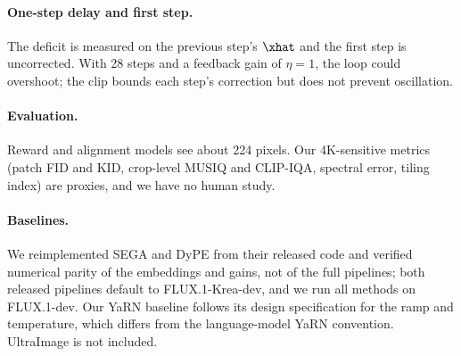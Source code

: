 \paragraph{One-step delay and first step.}
The deficit is measured on the previous step's $\xhat$ and the first step is uncorrected. With 28 steps and a feedback gain of $\eta=1$, the loop could overshoot; the clip bounds each step's correction but does not prevent oscillation. 

\paragraph{Evaluation.}
Reward and alignment models see about 224 pixels. Our 4K-sensitive metrics (patch FID and KID, crop-level MUSIQ and CLIP-IQA, spectral error, tiling index) are proxies, and we have no human study. 

\paragraph{Baselines.}
We reimplemented SEGA and DyPE from their released code and verified numerical parity of the embeddings and gains, not of the full pipelines; both released pipelines default to FLUX.1-Krea-dev, and we run all methods on FLUX.1-dev. Our YaRN baseline follows its design specification for the ramp and temperature, which differs from the language-model YaRN convention. UltraImage is not included. 
